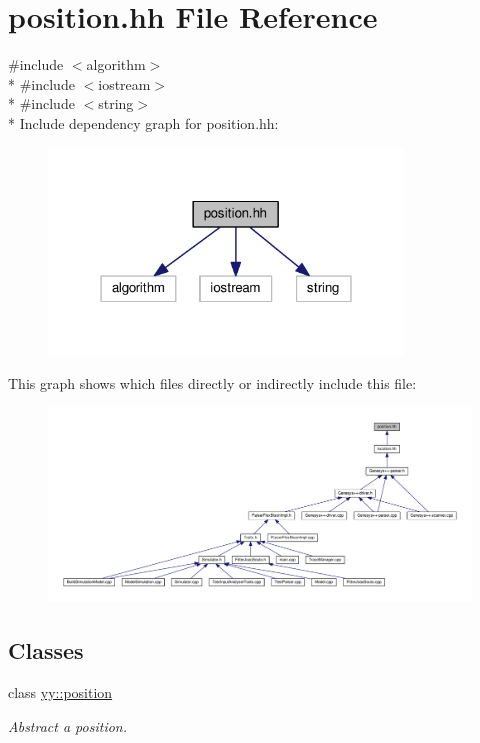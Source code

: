 \hypertarget{position_8hh}{\section{position.\-hh File Reference}
\label{position_8hh}
}
{\ttfamily \#include $<$algorithm$>$}\\*
{\ttfamily \#include $<$iostream$>$}\\*
{\ttfamily \#include $<$string$>$}\\*
Include dependency graph for position.\-hh\-:
\nopagebreak
\begin{figure}[H]
\begin{center}
\leavevmode
\includegraphics[width=267pt]{position_8hh__incl}
\end{center}
\end{figure}
This graph shows which files directly or indirectly include this file\-:
\nopagebreak
\begin{figure}[H]
\begin{center}
\leavevmode
\includegraphics[width=350pt]{position_8hh__dep__incl}
\end{center}
\end{figure}
\subsection*{Classes}
\begin{DoxyCompactItemize}
\item 
class \hyperlink{classyy_1_1position}{yy\-::position}
\begin{DoxyCompactList}\small\item\em Abstract a position. \end{DoxyCompactList}\end{DoxyCompactItemize}

